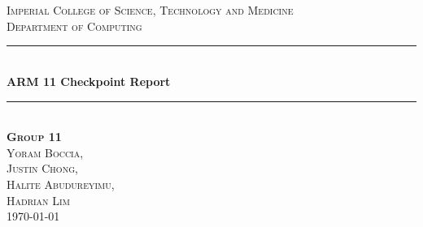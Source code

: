 \documentclass[a4paper]{article}
\begin{document}
\begin{titlepage}

\newcommand{\HRule}{\rule{\linewidth}{0.5mm}} %
\setlength{\topmargin}{0in}
\center %
 
 
 \begin{minipage}{0.4\textwidth}
\begin{flushleft} \large
\hspace*{-0.5cm}
\end{flushleft}
\end{minipage}
~
\begin{minipage}{0.5\textwidth}
\begin{flushright} \large
\hspace*{2cm}
\end{flushright}
\end{minipage}\\[1cm]

\textsc{\LARGE Imperial College of Science, Technology and Medicine}\\[1.5cm] %
\textsc{\Large Department of Computing}\\[0.5cm] %


\HRule \\[0.4cm]
{ \huge \bfseries ARM 11 Checkpoint Report}\\[0.4cm] %
\HRule \\[1cm]
 

\textsc{{\large
\textbf{Group 11} \\
Yoram \textsc{Boccia}, \\
Justin \textsc{Chong}, \\ 
Halite \textsc{Abudureyimu}, \\
Hadrian \textsc{Lim} }}\\[0.5cm]


{\large \today}\\[0.5cm] %


\vfill %

\end{titlepage}
\end{document}
